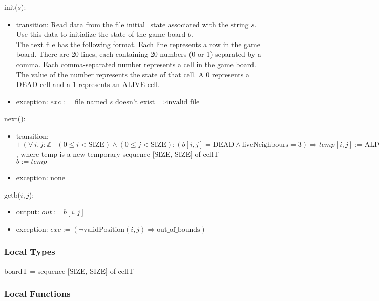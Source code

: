 \documentclass[12pt]{article}
\begin{document}
\noindent init($s$):
\begin{itemize}
\item transition: Read data from the file initial\_state associated with the string $s$. Use this data to initialize the state of the game board $b$. \\
The text file has the following format. Each line represents a row in the game board. There are 20 lines, each containing 20 numbers (0 or 1) separated by a comma.  Each comma-separated number represents a cell in the game board. The value of the number represents the state of that cell. A 0 represents a DEAD cell and a 1 represents an ALIVE cell.
\item exception: $exc :=$ file named $s$ doesn't exist $\Rightarrow \mbox{invalid\_file}$
\end{itemize}

\noindent next():
\begin{itemize}
\item transition: $+(\forall \ i, j : \mathbb{Z} \mid (0 \le i < \mbox{SIZE}) \land (0 \le j < \mbox{SIZE}) : (b[i, j] = \mbox{DEAD} \land \mbox{liveNeighbours} = 3) \Rightarrow temp[i,j] := \mbox{ALIVE} \mid (b[i, j] = \mbox{DEAD} \land \mbox{liveNeighbours} \neq 3) \Rightarrow temp[i,j] := \mbox{DEAD} \mid (b[i, j] = \mbox{ALIVE} \land (\mbox{liveNeighbours} \neq 2 \lor \mbox{liveNeighbours} \neq 3)) \Rightarrow temp[i,j] := \mbox{DEAD} \mid (b[i, j] = \mbox{ALIVE} \land (\mbox{liveNeighbours} = 2  \lor  \mbox{liveNeighbours} = 3)) \Rightarrow temp[i,j] := \mbox{ALIVE})$, where temp is a new temporary sequence [SIZE, SIZE] of cellT\\
$b := temp$
\item exception: none
\end{itemize}

\noindent getb($i, j$):
\begin{itemize}
\item output: $\mathit{out} := b[i, j]$
\item exception: $exc := (\lnot \mbox{validPosition}(i, j) \Rightarrow \mbox{out\_of\_bounds})$
\end{itemize}

\subsubsection* {Local Types}

boardT = sequence [SIZE, SIZE] of cellT

\subsubsection* {Local Functions}
\end{document}
